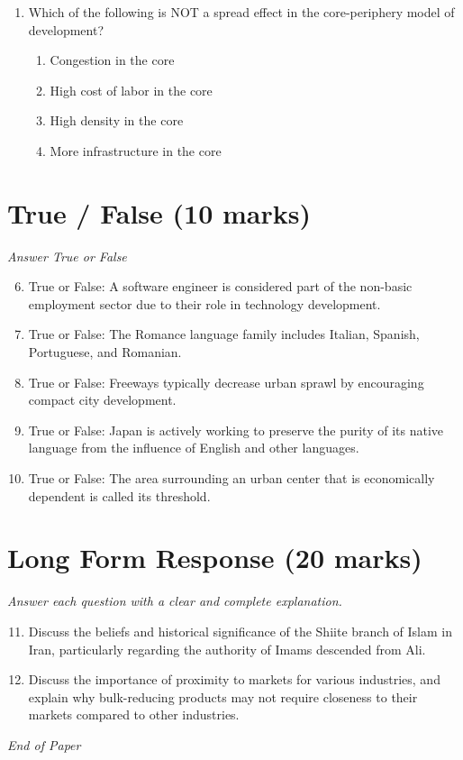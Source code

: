 \documentclass[12pt]{article}
\begin{document}
\begin{enumerate}[label=\arabic*.]
\begin{enumerate}[label=(\alph*)]
    \item Sub-Saharan Africa and Oceania
    \item Central Europe and Australia
\end{enumerate}
\item Which of the following is NOT a spread effect in the core-periphery model of development?
\begin{enumerate}[label=(\alph*)]
    \item Congestion in the core
    \item High cost of labor in the core
    \item High density in the core
    \item More infrastructure in the core
\end{enumerate}
\end{enumerate}

\section*{True / False (10 marks)}
\textit{Answer True or False}
\begin{enumerate}[label=\arabic*.]
\setcounter{enumi}{5}
\item True or False: A software engineer is considered part of the non-basic employment sector due to their role in technology development.
\item True or False: The Romance language family includes Italian, Spanish, Portuguese, and Romanian.
\item True or False: Freeways typically decrease urban sprawl by encouraging compact city development.
\item True or False: Japan is actively working to preserve the purity of its native language from the influence of English and other languages.
\item True or False: The area surrounding an urban center that is economically dependent is called its threshold.
\end{enumerate}

\section*{Long Form Response (20 marks)}
\textit{Answer each question with a clear and complete explanation.}
\begin{enumerate}[label=\arabic*.]
\setcounter{enumi}{10}
\item Discuss the beliefs and historical significance of the Shiite branch of Islam in Iran, particularly regarding the authority of Imams descended from Ali.
\item Discuss the importance of proximity to markets for various industries, and explain why bulk-reducing products may not require closeness to their markets compared to other industries.
\end{enumerate}

\vfill
\noindent\textit{End of Paper}
\end{document}
